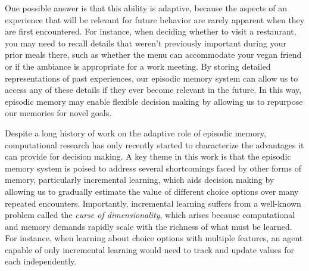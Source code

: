\documentclass[10pt,letterpaper]{article}
\begin{document}
One possible answer is that this ability is adaptive, because the aspects of an experience that will be relevant for future behavior are rarely apparent when they are first encountered. For instance, when deciding whether to visit a restaurant, you may need to recall details that weren't previously important during your prior meals there, such as whether the menu can accommodate your vegan friend or if the ambiance is appropriate for a work meeting. By storing detailed representations of past experiences, our episodic memory system can allow us to access any of these details if they ever become relevant in the future. In this way, episodic memory may enable flexible decision making by allowing us to repurpose our memories for novel goals.

Despite a long history of work on the adaptive role of episodic memory\cite{bartlettRememberingStudyExperimental1932, andersonHumanMemoryAdaptive1989, schacterMemoryDistortionAdaptive2011, shohamyDopamineAdaptiveMemory2010}, computational research has only recently started to characterize the advantages it can provide for decision making\cite{lengyelHippocampalContributionsControl2008, gershmanReinforcementLearningEpisodic2017, nagyInterplayEpisodicSemantic2025}. A key theme in this work is that the episodic memory system is poised to address several shortcomings faced by other forms of memory, particularly incremental learning, which aids decision making by allowing us to gradually estimate the value of different choice options over many repeated encounters\cite{rescorlaTheoryPavlovianConditioning1972, shohamyHabitsReinforcementLearning2014, knowltonNeostriatalHabitLearning1996, schultzNeuralSubstratePrediction1997, bayerMidbrainDopamineNeurons2005, shohamyRoleDopamineCognitive2005, zaghloulHumanSubstantiaNigra2009}. Importantly, incremental learning suffers from a well-known problem called the \textit{curse of dimensionality}, which arises because computational and memory demands rapidly scale with the richness of what must be learned\cite{suttonReinforcementLearningSecond2018}. For instance, when learning about choice options with multiple features, an agent capable of only incremental learning would need to track and update values for each independently.
\end{document}
